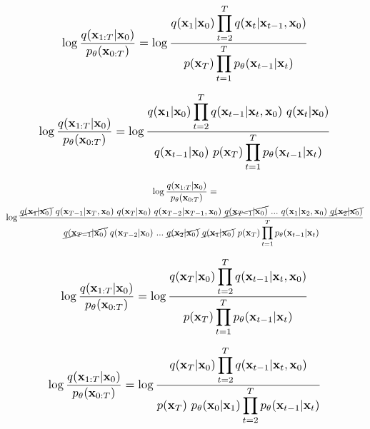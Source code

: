 \documentclass{article}
\newcommand*{\Scale}[2][4]{\scalebox{#1}{\ensuremath{#2}}}
\begin{document}
\begin{equation}
\Scale[1.2]{ \displaystyle \log \frac{q(\textbf{x}_{1:T}|\textbf{x}_0)}{p_\theta(\textbf{x}_{0:T})} = \log \frac{q(\textbf{x}_1|\textbf{x}_0) \displaystyle \prod_{t=2}^{T} q(\textbf{x}_{t}|\textbf{x}_{t-1},\textbf{x}_0) } { p(\textbf{x}_T) \displaystyle \prod_{t=1}^{T} p_\theta(\textbf{x}_{t-1}|\textbf{x}_{t})} }
\end{equation}

\begin{equation}
\Scale[1.2]{ \displaystyle \log \frac{q(\textbf{x}_{1:T}|\textbf{x}_0)}{p_\theta(\textbf{x}_{0:T})} = \log \frac{q(\textbf{x}_1|\textbf{x}_0) \displaystyle \prod_{t=2}^{T} q(\textbf{x}_{t-1}|\textbf{x}_t,\textbf{x}_0) \ q(\textbf{x}_{t}|\textbf{x}_0) } { q(\textbf{x}_{t-1}|\textbf{x}_0) \ p(\textbf{x}_T) \displaystyle \prod_{t=1}^{T} p_\theta(\textbf{x}_{t-1}|\textbf{x}_{t})} }
\end{equation}

\begin{gather}
\nonumber \Scale[1]{ \displaystyle \log \frac{q(\textbf{x}_{1:T}|\textbf{x}_0)}{p_\theta(\textbf{x}_{0:T})} } = \\
\Scale[1]{ \displaystyle \log \frac{ 
\cancel{q(\textbf{x}_1|\textbf{x}_0)}
\ q(\textbf{x}_{T-1}|\textbf{x}_T,\textbf{x}_0) \ q(\textbf{x}_T|\textbf{x}_0) 
\ q(\textbf{x}_{T-2}|\textbf{x}_{T-1},\textbf{x}_0) \ \cancel{q(\textbf{x}_{T-1}|\textbf{x}_0)} 
\ ...
\ q(\textbf{x}_{1}|\textbf{x}_{2},\textbf{x}_0) \ \cancel{q(\textbf{x}_{2}|\textbf{x}_0)} 
} 
{ 
\cancel{q(\textbf{x}_{T-1}|\textbf{x}_0)} 
\ q(\textbf{x}_{T-2}|\textbf{x}_0)
\ ...
\ \cancel{q(\textbf{x}_{2}|\textbf{x}_0)}
\ \cancel{q(\textbf{x}_{1}|\textbf{x}_0)}
\ p(\textbf{x}_T) \displaystyle \prod_{t=1}^{T} p_\theta(\textbf{x}_{t-1}|\textbf{x}_{t}) } }
 \end{gather}

\begin{equation}
\Scale[1.2]{ \displaystyle \log \frac{q(\textbf{x}_{1:T}|\textbf{x}_0)}{p_\theta(\textbf{x}_{0:T})} = \log \frac{
q(\textbf{x}_T|\textbf{x}_0) \displaystyle \prod_{t=2}^{T} q(\textbf{x}_{t-1}|\textbf{x}_t,\textbf{x}_0)
} 
{ 
p(\textbf{x}_T) \displaystyle \prod_{t=1}^{T} p_\theta(\textbf{x}_{t-1}|\textbf{x}_{t})
} }
\end{equation}

\begin{equation}
\Scale[1.2]{ \displaystyle \log \frac{q(\textbf{x}_{1:T}|\textbf{x}_0)}{p_\theta(\textbf{x}_{0:T})} = \log \frac{
q(\textbf{x}_T|\textbf{x}_0) \displaystyle \prod_{t=2}^{T} q(\textbf{x}_{t-1}|\textbf{x}_t,\textbf{x}_0)
} 
{ 
p(\textbf{x}_T) \ p_\theta(\textbf{x}_0|\textbf{x}_1) \displaystyle \prod_{t=2}^{T} p_\theta(\textbf{x}_{t-1}|\textbf{x}_{t})
} }
\end{equation}
\end{document}
